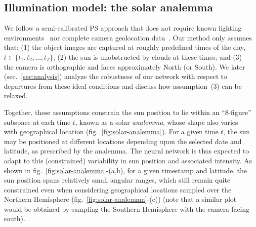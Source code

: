 \subsection{Illumination model: the solar analemma}
\label{sec:analemma}

We follow a semi-calibrated PS approach that does not require known lighting environments~\cite{yu-iccp-13} nor complete camera geolocation data~\cite{jung-cvpr-15}. Our method only assumes that: (1) the object images are captured at roughly predefined times of the day, $t \in \{t_1, t_2, \ldots, t_T \}$; (2) the sun is unobstructed by clouds at these times; and (3) the camera is orthographic and faces approximately North (or South). We later (sec.~\ref{sec:analysis}) analyze the robustness of our network with respect to departures from these ideal conditions and discuss how assumption~(3) can be relaxed.

Together, these assumptions constrain the sun position to lie within an ``8-figure'' subspace at each time $t$, known as a solar {\em analemma}, whose shape also varies with geographical location (fig.~\ref{fig:solar-analemma}). For a given time $t$, the sun may be positioned at different locations depending upon the selected date and latitude, as prescribed by the analemma. The neural network is thus expected to adapt to this (constrained) variability in sun position and associated intensity. As shown in fig.~\ref{fig:solar-analemma}-(a,b), for a given timestamp and latitude, the sun position spans relatively small angular ranges, which still remain quite constrained even when considering geographical locations sampled over the Northern Hemisphere (fig.~\ref{fig:solar-analemma}-(c)) (note that a similar plot would be obtained by sampling the Southern Hemisphere with the camera facing south). 



